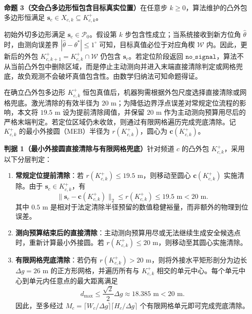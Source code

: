 \documentclass[zihao=-4,a4paper,UTF8]{ctexart}
\begin{document}
\noindent\textbf{命题 3（交会凸多边形恒包含目标真实位置）}\quad 在任意步 $k \ge 0$，算法维护的凸外包多边形恒满足 $\mathbf{s}_c \in X_{c, k} \subseteq K_{c, k}^+$。

\begin{cumcmproof}
初始外切多边形满足 $\mathbf{s}_c \in \mathcal{P}_0$。假设第 $k$ 步包含性成立；当系统接收到新方位角 $\hat{\theta}$ 时，由测向误差界 $|\hat{\theta}-\theta^*|\le 1^\circ$ 可知，目标真值必位于对应角楔 $\mathcal{W}$ 内。因此，更新后的外包 $K_{c,k+1}^+=K_{c,k}^+\cap\mathcal{W}$ 仍包含 $\mathbf{s}_c$。若定位阶段返回 $\texttt{no\_signal}$，算法不从当前凸外包中删除区域，而是停止主动测向并进入末端直接清除判定或网格兜底，故负观测不会破坏真值包含性。由数学归纳法可知命题得证。
\end{cumcmproof}

在确立凸外包多边形 $K_{c,k}^+$ 恒包真值后，机器狗需根据外包尺度选择直接清除或网格兜底。激光清除的有效半径为 $20\text{ m}$；为降低边界浮点误差对常规定位流程的影响，本文将 $19.5\text{ m}$ 设为提前清除阈值，并保留 $20\text{ m}$ 作为主动测向预算用尽后的严格末端判定。若定位区域仍未收敛，则通过有限网格遍历完成兜底清除。记 $K_{c,k}^+$ 的最小外接圆（MEB）半径为 $r(K_{c,k}^+)$，圆心为 $\mathbf{c}(K_{c,k}^+)$。

\noindent\textbf{判据 1（最小外接圆直接清除与有限网格兜底）}\quad 针对频道 $c$ 的凸外包 $K_{c,k}^+$，采用以下分层判定：
\begin{enumerate}[leftmargin=2.5em, itemsep=0.15em]
    \item \textbf{常规定位提前清除}：若 $r(K_{c,k}^+)\le 19.5\text{ m}$，则移动至圆心 $\mathbf{c}(K_{c,k}^+)$ 实施清除。由于 $\mathbf{s}_c\in K_{c,k}^+$，有
    \begin{equation}
        \|\mathbf{s}_c-\mathbf{c}(K_{c,k}^+)\|_2\le r(K_{c,k}^+)\le 19.5\text{ m}<20\text{ m}.
    \end{equation}
    其中 $0.5\text{ m}$ 是相对于法定清除半径预留的数值稳健裕量，而非额外的物理到位误差。
    \item \textbf{测向预算结束后的直接清除}：主动测向预算用尽或无法继续生成安全候选点时，重新计算最小外接圆。若 $r(K_{c,k}^+)\le20\text{ m}$，则移动至其圆心实施清除。
    \item \textbf{有限网格兜底清除}：若仍有 $r(K_{c,k}^+)>20\text{ m}$，则将外接水平矩形剖分为边长 $\Delta g=26\text{ m}$ 的正方形网格，并遍历所有与 $K_{c,k}^+$ 相交的单元中心。每个单元中心到单元内任意点的最大距离满足
    \begin{equation}
        d_{\max}\le\frac{\sqrt{2}}{2}\Delta g\approx18.385\text{ m}<20\text{ m}.
    \end{equation}
    因此，至多经过 $M_c=\lceil W_c/\Delta g\rceil\lceil H_c/\Delta g\rceil$ 个有限网格单元即可完成兜底清除。
\end{enumerate}
\end{document}
